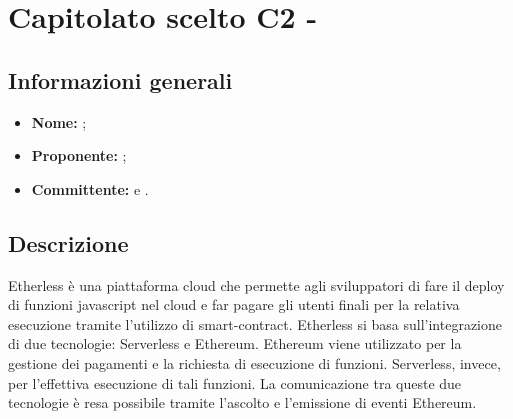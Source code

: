 \section{Capitolato scelto C2 - \NomeProgetto}

\subsection{Informazioni generali}
	\begin{itemize}
		\item \textbf{Nome:} \NomeProgetto{}; 
		\item \textbf{Proponente:} \Proponente;
		\item \textbf{Committente:} \TV{} e \RC{}. 
	\end{itemize}

\subsection{Descrizione}
Etherless è una piattaforma cloud che permette agli sviluppatori di fare il deploy di funzioni javascript nel cloud e far pagare gli utenti finali per la relativa esecuzione tramite l'utilizzo di smart-contract. Etherless si basa sull'integrazione di due tecnologie: Serverless e Ethereum. Ethereum viene utilizzato per la gestione dei pagamenti e la richiesta di esecuzione di funzioni. Serverless, invece, per l'effettiva esecuzione di tali funzioni. La comunicazione tra queste due tecnologie è resa possibile tramite l'ascolto e l'emissione di eventi Ethereum. 


